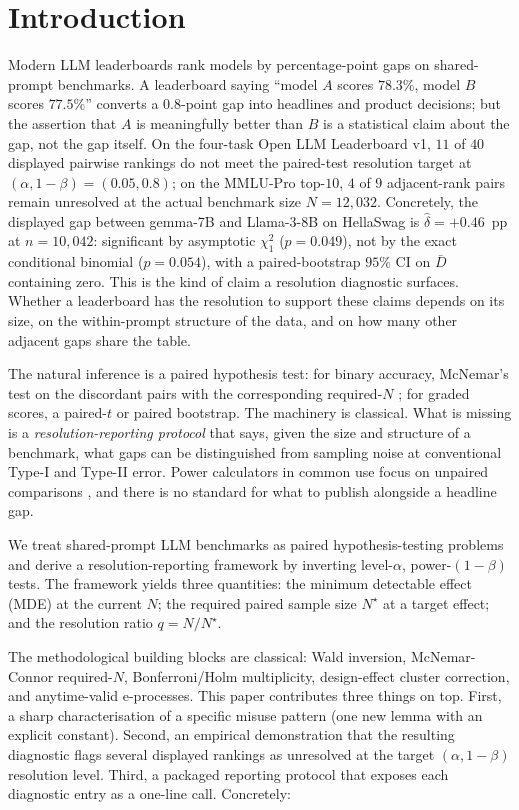 \documentclass{article}
\theoremstyle{plain}
\theoremstyle{definition}
\begin{document}
\section{Introduction}
\label{sec:intro}

Modern LLM leaderboards rank models by percentage-point gaps on shared-prompt benchmarks. A leaderboard saying ``model $A$ scores $78.3\%$, model $B$ scores $77.5\%$'' converts a $0.8$-point gap into headlines and product decisions; but the assertion that $A$ is meaningfully better than $B$ is a statistical claim about the gap, not the gap itself. On the four-task Open LLM Leaderboard v1, $11$ of $40$ displayed pairwise rankings do not meet the paired-test resolution target at $(\alpha,1{-}\beta){=}(0.05,0.8)$; on the MMLU-Pro top-$10$, $4$ of $9$ adjacent-rank pairs remain unresolved at the actual benchmark size $N{=}12{,}032$. Concretely, the displayed gap between gemma-7B and Llama-3-8B on HellaSwag is $\hat\delta{=}{+}0.46$~pp at $n{=}10{,}042$: significant by asymptotic $\chi^2_1$ ($p{=}0.049$), not by the exact conditional binomial ($p{=}0.054$), with a paired-bootstrap $95\%$ CI on $\bar D$ containing zero. This is the kind of claim a resolution diagnostic surfaces. Whether a leaderboard has the resolution to support these claims depends on its size, on the within-prompt structure of the data, and on how many other adjacent gaps share the table.

The natural inference is a paired hypothesis test: for binary accuracy, McNemar's test on the discordant pairs with the corresponding required-$N$ \citep{mcnemar1947note,connor1987sample}; for graded scores, a paired-$t$ or paired bootstrap. The machinery is classical. What is missing is a \emph{resolution-reporting protocol} that says, given the size and structure of a benchmark, what gaps can be distinguished from sampling noise at conventional Type-I and Type-II error. Power calculators in common use focus on unpaired comparisons \citep{miller2024errorbars}, and there is no standard for what to publish alongside a headline gap.

We treat shared-prompt LLM benchmarks as paired hypothesis-testing problems and derive a resolution-reporting framework by inverting level-$\alpha$, power-$(1{-}\beta)$ tests. The framework yields three quantities: the minimum detectable effect (MDE) at the current $N$; the required paired sample size $N^{\star}$ at a target effect; and the resolution ratio $q=N/N^{\star}$.

The methodological building blocks are classical: Wald inversion, McNemar-Connor required-$N$, Bonferroni/Holm multiplicity, design-effect cluster correction, and anytime-valid e-processes. This paper contributes three things on top. First, a sharp characterisation of a specific misuse pattern (one new lemma with an explicit constant). Second, an empirical demonstration that the resulting diagnostic flags several displayed rankings as unresolved at the target $(\alpha, 1{-}\beta)$ resolution level. Third, a packaged reporting protocol that exposes each diagnostic entry as a one-line call. Concretely:
\end{document}
